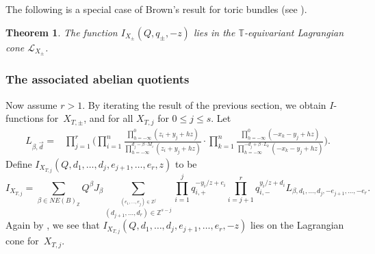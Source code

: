 \documentclass[11pt]{article}
\numberwithin{equation}{section}
\newtheorem{Theorem}{Theorem}[section]
\numberwithin{equation}{section}
\newcommand{\cc}[1]{\mathcal{#1}} %
\newcommand{\ZZ}{\mathbb{Z}}
\newcommand{\torus}{\mathbb{T}}
\newcommand{\MB}{M}
\newcommand{\LB}{L}
\newcommand{\z}{z}
\newcommand{\x}{x}
\newcommand{\y}{y}
\begin{document}
The following is a special case of Brown's result for toric bundles (see \cite{Brown}).
\begin{Theorem}
The function $I_{X_\pm}(Q, q_\pm, -z)$ lies in the $\torus$-equivariant Lagrangian cone $\cc L_{X_\pm}$.
\end{Theorem}

\subsubsection{The associated abelian quotients}
Now assume $r > 1$. By iterating the result of the previous section, we obtain $I$-functions for~$X_{T, \pm}$, and for all $X_{T, j}$ for $0 \leq j \leq s$.
Let
\begin{align*}
	L_{\beta,\vec{d}}={}& \prod_{j=1}^r \Biggl(\prod_{i=1}^n \frac{\prod_{h=-\infty}^0 (\z_i+\y_j+hz)}{\prod_{h=-\infty}^{d_j-\beta\cdot \MB_i} (\z_i+\y_j+hz)}
	\cdot \prod_{k=1}^{n}\frac{\prod_{h=-\infty}^{0}(-\x_k -\y_j+hz)}{\prod_{h=-\infty}^{-d_j+\beta\cdot \LB_k}(-\x_k -\y_j+hz)}\Biggr).
\end{align*}
Define $I_{X_{T, j}} (Q, d_1, \dots, d_j, e_{j+1}, \dots, e_r, z)$ to be
\begin{equation*} I_{X_{T, j}} =
\sum_{\beta \in NE(B)_\ZZ} Q^\beta J_\beta \sum_{\stackrel{(e_1, \dots, e_j) \in \ZZ^j}{ (d_{j+1}, \dots, d_r) \in \ZZ^{s-j}}} \prod_{i=1}^j q_{i, +}^{-\y_i/z+e_i}\prod_{i=j+1}^r q_{i, -}^{\y_i/z+d_i}
L_{\beta, d_1, \dots, d_j, -e_{j+1}, \dots, -e_r}.
\end{equation*}
Again by \cite{Brown}, we see that $I_{X_{T, j}} (Q, d_1, {\dots}, d_j, e_{j+1}, {\dots}, e_r, -z)$ lies on the Lagrangian cone for~$X_{T, j}$.
\end{document}
